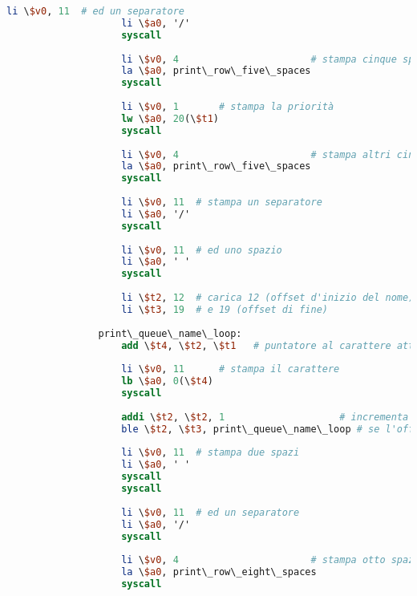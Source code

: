 \begin{center}
\begin{lstlisting}[language=mips, gobble=14, stepnumber=1]
                    li \$v0, 11  # ed un separatore
                    li \$a0, '/'
                    syscall
                    
                    li \$v0, 4                       # stampa cinque spazi
                    la \$a0, print\_row\_five\_spaces
                    syscall
                    
                    li \$v0, 1       # stampa la priorità
                    lw \$a0, 20(\$t1)
                    syscall
                    
                    li \$v0, 4                       # stampa altri cinque spazi
                    la \$a0, print\_row\_five\_spaces
                    syscall
                    
                    li \$v0, 11  # stampa un separatore
                    li \$a0, '/'
                    syscall
                    
                    li \$v0, 11  # ed uno spazio
                    li \$a0, ' '
                    syscall
                    
                    li \$t2, 12  # carica 12 (offset d'inizio del nome)
                    li \$t3, 19  # e 19 (offset di fine)
                    
                print\_queue\_name\_loop:
                    add \$t4, \$t2, \$t1   # puntatore al carattere attuale (indirizzo base \$t1 + offset attuale \$t2)
                    
                    li \$v0, 11      # stampa il carattere
                    lb \$a0, 0(\$t4)
                    syscall
                    
                    addi \$t2, \$t2, 1                    # incrementa l'offset
                    ble \$t2, \$t3, print\_queue\_name\_loop # se l'offset è minore o uguale dell'offset massimo, esegue un altro ciclo
                    
                    li \$v0, 11  # stampa due spazi
                    li \$a0, ' '
                    syscall
                    syscall
                    
                    li \$v0, 11  # ed un separatore
                    li \$a0, '/'
                    syscall
                    
                    li \$v0, 4                       # stampa otto spazi
                    la \$a0, print\_row\_eight\_spaces
                    syscall
                    

\end{lstlisting}
\end{center}
